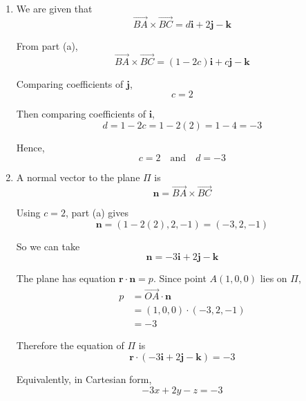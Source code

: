 \documentclass[leqno]{article}
\begin{document}
\begin{enumerate}[
  label=\textbf{\arabic*.},
  leftmargin=*,
  topsep=0pt,
  partopsep=0pt,
  parsep=0pt
]
\begin{tcolorbox}[colback=white, colframe=scarlet, title={\textbf{Solution}}, breakable, grow to left by=6mm, grow to right by=10mm]
\begin{enumerate}[label=\textbf{(\alph*)}]
Now take the cross product:
\begin{align*}
\overrightarrow{BA}\times \overrightarrow{BC}
&=
\begin{vmatrix}
\mathbf i & \mathbf j & \mathbf k\\
-1 & -2 & -1\\
-1 & -1 & c-1
\end{vmatrix} \\
&=\mathbf i\bigl((-2)(c-1)-(-1)(-1)\bigr)
-\mathbf j\bigl((-1)(c-1)-(-1)(-1)\bigr)
+\mathbf k\bigl((-1)(-1)-(-2)(-1)\bigr) \\
&=\mathbf i\bigl(-2c+2-1\bigr)
-\mathbf j\bigl(-c+1-1\bigr)
+\mathbf k(1-2) \\
&=(1-2c)\mathbf i+c\mathbf j-\mathbf k
\end{align*}

So,
\[
\overrightarrow{BA}\times \overrightarrow{BC}=(1-2c)\mathbf i+c\mathbf j-\mathbf k
\]

  \item We are given that
\[
\overrightarrow{BA}\times \overrightarrow{BC}=d\mathbf i+2\mathbf j-\mathbf k
\]

From part (a),
\[
\overrightarrow{BA}\times \overrightarrow{BC}=(1-2c)\mathbf i+c\mathbf j-\mathbf k
\]

Comparing coefficients of \(\mathbf j\),
\[
c=2
\]

Then comparing coefficients of \(\mathbf i\),
\[
d=1-2c=1-2(2)=1-4=-3
\]

Hence,
\[
c=2 \quad \text{and} \quad d=-3
\]

  \item A normal vector to the plane \(\Pi\) is
\[
\mathbf n=\overrightarrow{BA}\times \overrightarrow{BC}
\]

Using \(c=2\), part (a) gives
\[
\mathbf n=(1-2(2),2,-1)=(-3,2,-1)
\]

So we can take
\[
\mathbf n=-3\mathbf i+2\mathbf j-\mathbf k
\]

The plane has equation \(\mathbf r\cdot \mathbf n=p\). Since point \(A(1,0,0)\) lies on \(\Pi\),
\begin{align*}
p&=\overrightarrow{OA}\cdot \mathbf n \\
&=(1,0,0)\cdot(-3,2,-1) \\
&=-3
\end{align*}

Therefore the equation of \(\Pi\) is
\[
\mathbf r\cdot(-3\mathbf i+2\mathbf j-\mathbf k)=-3
\]

Equivalently, in Cartesian form,
\[
-3x+2y-z=-3
\]


\end{enumerate}
\end{tcolorbox}
\end{enumerate}
\end{document}
